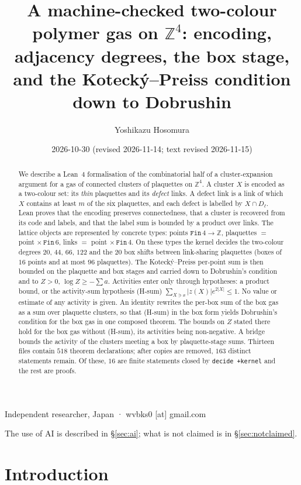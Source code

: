 \documentclass[11pt,a4paper]{article}
\title{A machine-checked two-colour polymer gas on $\mathbb{Z}^4$: encoding, adjacency degrees, the box stage, and the Kotecký--Preiss condition down to Dobrushin}
\author{Yoshikazu Hosomura}
\date{2026-10-30 (revised 2026-11-14; text revised 2026-11-15)}
\theoremstyle{definition}
\theoremstyle{remark}
\begin{document}
\maketitle
\begin{center}\small Independent researcher, Japan · wvbks0 [at] gmail.com\end{center}
\begin{center}\small The use of AI is described in \S\ref{sec:ai}; what is not claimed is in \S\ref{sec:notclaimed}.\end{center}

\begin{abstract}
We describe a Lean~4 formalisation of the combinatorial half of a cluster-expansion argument for a gas of connected clusters of plaquettes on $\mathbb{Z}^4$. A cluster $X$ is encoded as a two-colour set: its \emph{thin} plaquettes and its \emph{defect} links. A defect link is a link of which $X$ contains at least $m$ of the six plaquettes, and each defect is labelled by $X\cap D_\ell$. Lean proves that the encoding preserves connectedness, that a cluster is recovered from its code and labels, and that the label sum is bounded by a product over links. The lattice objects are represented by concrete types: points $\mathtt{Fin}\,4\to\mathbb{Z}$, plaquettes $=$ point $\times\,\mathtt{Fin}\,6$, links $=$ point $\times\,\mathtt{Fin}\,4$. On these types the kernel decides the two-colour degrees $20$, $44$, $66$, $122$ and the $20$ box shifts between link-sharing plaquettes (boxes of $16$ points and at most $96$ plaquettes). The Kotecký--Preiss per-point sum is then bounded on the plaquette and box stages and carried down to Dobrushin's condition and to $Z>0$, $\log Z\ge-\sum a$. Activities enter only through hypotheses: a product bound, or the activity-sum hypothesis (H-sum) $\sum_{X\ni x}|z(X)|e^{2|X|}\le1$. No value or estimate of any activity is given. An identity rewrites the per-box sum of the box gas as a sum over plaquette clusters, so that (H-sum) in the box form yields Dobrushin's condition for the box gas in one composed theorem. The bounds on $Z$ stated there hold for the box gas without (H-sum), its activities being non-negative. A bridge bounds the activity of the clusters meeting a box by plaquette-stage sums. Thirteen files contain $518$ theorem declarations; after copies are removed, $163$ distinct statements remain. Of these, $16$ are finite statements closed by \texttt{decide +kernel} and the rest are proofs.
\end{abstract}

\section{Introduction}\label{sec:intro}
\end{document}
